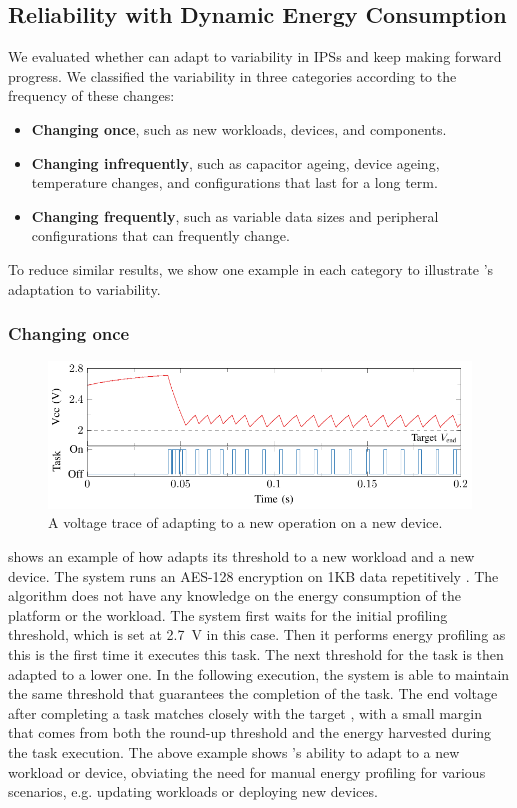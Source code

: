 \subsection{Reliability with Dynamic Energy Consumption}

We evaluated whether \nn{} can adapt to variability in IPSs and keep making forward progress.
We classified the variability in three categories according to the frequency of these changes: 
\begin{itemize}
    \item \textbf{Changing once}, such as new workloads, devices, and components.
    \item \textbf{Changing infrequently}, such as capacitor ageing, device ageing, temperature changes, and configurations that last for a long term.
    \item \textbf{Changing frequently}, such as variable data sizes and peripheral configurations that can frequently change. 
\end{itemize}
To reduce similar results, we show one example in each category to illustrate \nn{}'s adaptation to variability. 

\subsubsection{Changing once}

\begin{figure}
    \centering
    \includegraphics[width=\columnwidth]{ch5_optic/figures/v_trace/v_trace.pdf}
    \caption{A voltage trace of \nn{} adapting to a new operation on a new device. }
    \label{fig:v_trace}
\end{figure}

 shows an example of how \nn{} adapts its threshold to a new workload and a new device. 
The system runs an AES-128 encryption on 1KB data repetitively . 
The algorithm does not have any knowledge on the energy consumption of the platform or the workload.
The system first waits for the initial profiling threshold, which is set at \SI{2.7}{\volt} in this case. 
Then it performs energy profiling as this is the first time it executes this task. 
The next threshold for the task is then adapted to a lower one.
In the following execution, the system is able to maintain the same threshold that guarantees the completion of the task. 
The end voltage after completing a task matches closely with the target , with a small margin that comes from both the round-up threshold and the energy harvested during the task execution. 
The above example shows \nn{}'s ability to adapt to a new workload or device, obviating the need for manual energy profiling for various scenarios, e.g. updating workloads or deploying new devices. 

